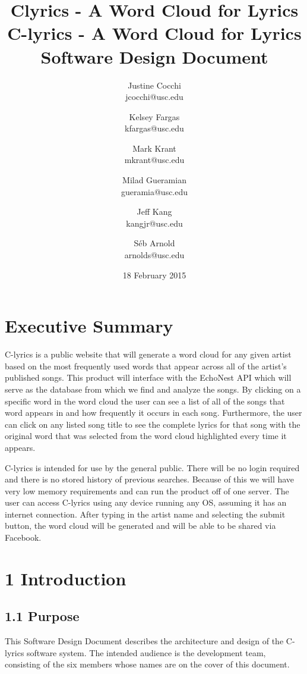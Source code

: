 \documentclass[]{article}
\title{Clyrics - A Word Cloud for Lyrics}
\author{Justine Cocchi\\jcocchi@usc.edu \and Kelsey Fargas\\kfargas@usc.edu \and Mark Krant \\ mkrant@usc.edu\and Milad Gueramian\\gueramia@usc.edu \and Jeff Kang\\kangjr@usc.edu \and Séb Arnold\\arnolds@usc.edu}
\date{18 February 2015}
\title{%
	C-lyrics - A Word Cloud for Lyrics \\
	\large Software Design Document}
\begin{document}
\clearpage\maketitle
\thispagestyle{empty}

\pagebreak

\tableofcontents
\setcounter{tocdepth}{3}
\thispagestyle{empty}

\pagebreak

\section{Executive Summary}\label{executive-summary}

C-lyrics is a public website that will generate a word cloud for any
given artist based on the most frequently used words that appear across
all of the artist's published songs. This product will interface with
the EchoNest API which will serve as the database from which we find and
analyze the songs. By clicking on a specific word in the word cloud the
user can see a list of all of the songs that word appears in and how
frequently it occurs in each song. Furthermore, the user can click on
any listed song title to see the complete lyrics for that song with the
original word that was selected from the word cloud highlighted every
time it appears.

C-lyrics is intended for use by the general public. There will be no
login required and there is no stored history of previous searches.
Because of this we will have very low memory requirements and can run
the product off of one server. The user can access C-lyrics using any
device running any OS, assuming it has an internet connection. After
typing in the artist name and selecting the submit button, the word
cloud will be generated and will be able to be shared via Facebook.

\pagebreak

\section{1 Introduction}\label{introduction}

\subsection{1.1 Purpose}\label{purpose}

This Software Design Document describes the architecture and design of
the C-lyrics software system. The intended audience is the development
team, consisting of the six members whose names are on the cover of this
document.
\end{document}
